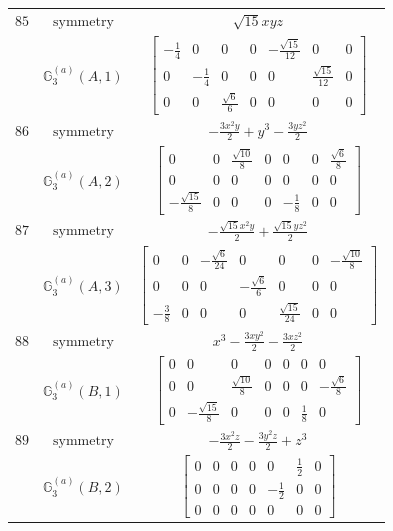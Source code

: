 \documentclass[fleqn,8pt,landscape]{jsarticle}
\begin{document}
\begin{longtable}{ccc}
$ 85 $ & $ \text{symmetry} $ & $ \sqrt{15} x y z $ \\
$  $ & $ \mathbb{G}_{3}^{(a)}(A,1) $ & $ \begin{bmatrix} - \frac{1}{4} & 0 & 0 & 0 & - \frac{\sqrt{15}}{12} & 0 & 0 \\ 0 & - \frac{1}{4} & 0 & 0 & 0 & \frac{\sqrt{15}}{12} & 0 \\ 0 & 0 & \frac{\sqrt{6}}{6} & 0 & 0 & 0 & 0 \end{bmatrix} $ \\ \hline
$ 86 $ & $ \text{symmetry} $ & $ - \frac{3 x^{2} y}{2} + y^{3} - \frac{3 y z^{2}}{2} $ \\
$  $ & $ \mathbb{G}_{3}^{(a)}(A,2) $ & $ \begin{bmatrix} 0 & 0 & \frac{\sqrt{10}}{8} & 0 & 0 & 0 & \frac{\sqrt{6}}{8} \\ 0 & 0 & 0 & 0 & 0 & 0 & 0 \\ - \frac{\sqrt{15}}{8} & 0 & 0 & 0 & - \frac{1}{8} & 0 & 0 \end{bmatrix} $ \\ \hline
$ 87 $ & $ \text{symmetry} $ & $ - \frac{\sqrt{15} x^{2} y}{2} + \frac{\sqrt{15} y z^{2}}{2} $ \\
$  $ & $ \mathbb{G}_{3}^{(a)}(A,3) $ & $ \begin{bmatrix} 0 & 0 & - \frac{\sqrt{6}}{24} & 0 & 0 & 0 & - \frac{\sqrt{10}}{8} \\ 0 & 0 & 0 & - \frac{\sqrt{6}}{6} & 0 & 0 & 0 \\ - \frac{3}{8} & 0 & 0 & 0 & \frac{\sqrt{15}}{24} & 0 & 0 \end{bmatrix} $ \\ \hline
$ 88 $ & $ \text{symmetry} $ & $ x^{3} - \frac{3 x y^{2}}{2} - \frac{3 x z^{2}}{2} $ \\
$  $ & $ \mathbb{G}_{3}^{(a)}(B,1) $ & $ \begin{bmatrix} 0 & 0 & 0 & 0 & 0 & 0 & 0 \\ 0 & 0 & \frac{\sqrt{10}}{8} & 0 & 0 & 0 & - \frac{\sqrt{6}}{8} \\ 0 & - \frac{\sqrt{15}}{8} & 0 & 0 & 0 & \frac{1}{8} & 0 \end{bmatrix} $ \\ \hline
$ 89 $ & $ \text{symmetry} $ & $ - \frac{3 x^{2} z}{2} - \frac{3 y^{2} z}{2} + z^{3} $ \\
$  $ & $ \mathbb{G}_{3}^{(a)}(B,2) $ & $ \begin{bmatrix} 0 & 0 & 0 & 0 & 0 & \frac{1}{2} & 0 \\ 0 & 0 & 0 & 0 & - \frac{1}{2} & 0 & 0 \\ 0 & 0 & 0 & 0 & 0 & 0 & 0 \end{bmatrix} $ \\ \hline

\end{longtable}
\end{document}
